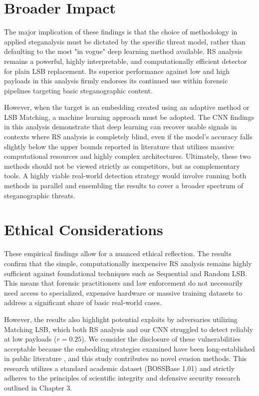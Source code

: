\section{Broader Impact}

The major implication of these findings is that the choice of methodology in applied steganalysis must be dictated by the specific threat model, 
rather than defaulting to the most "in vogue" deep learning method available. 
RS analysis remains a powerful, highly interpretable, and computationally efficient detector for plain LSB replacement. 
Its superior performance against low and high payloads in this analysis firmly endorses its continued use within forensic pipelines 
targeting basic steganographic content. 

However, when the target is an embedding created using an adaptive method or LSB Matching, a machine learning approach must be adopted. 
The CNN findings in this analysis demonstrate that deep learning can recover usable signals in contexts where RS analysis is completely blind, 
even if the model's accuracy falls slightly below the upper bounds reported in literature that utilizes massive computational resources and highly complex architectures. 
Ultimately, these two methods should not be viewed strictly as competitors, but as complementary tools. 
A highly viable real-world detection strategy would involve running both methods in parallel and ensembling the results to cover a broader 
spectrum of steganographic threats.

\section{Ethical Considerations}

These empirical findings allow for a nuanced ethical reflection. The results confirm that the simple, computationally inexpensive 
RS analysis remains highly sufficient against foundational techniques such as Sequential and Random LSB. 
This means that forensic practitioners and law enforcement do not necessarily need access to specialized, expensive hardware or 
massive training datasets to address a significant share of basic real-world cases. 

However, the results also highlight potential exploits by adversaries utilizing Matching LSB, which both RS analysis and our CNN struggled to 
detect reliably at low payloads ($r = 0.25$). 
We consider the disclosure of these vulnerabilities acceptable because the embedding strategies examined have been long-established in public 
literature \cite{Sharp2001, Ker2005, Luo2010}, and this study contributes no novel evasion methods. 
This research utilizes a standard academic dataset (BOSSBase 1.01) and strictly adheres to the principles of scientific integrity and defensive 
security research outlined in Chapter 3.